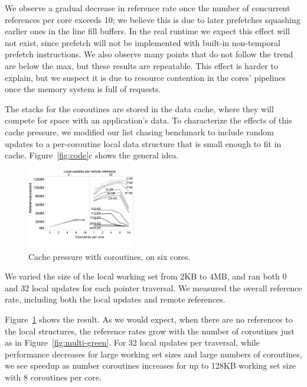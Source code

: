 \documentclass[10pt,nocopyrightspace,preprint]{sigplanconf}
\begin{document}
We observe a gradual decrease in reference rate once the number of
concurrent references per core exceeds 10; we believe this is due to
later prefetches squashing earlier ones in the line fill buffers. In the real runtime we expect this effect will not exist, since prefetch will not be implemented with built-in non-temporal prefetch instructions. We
also observe many points that do not follow the trend are below the max, but these results are repeatable. This effect is harder to explain, but we suspect it is
due to resource contention in the cores' pipelines once the memory
system is full of requests. 



The stacks for the coroutines are stored in the data cache, where they
will compete for space with an application's data. To characterize the
effects of this cache pressure, we modified our list chasing benchmark
to include random updates to a per-coroutine local data structure that
is small enough to fit in cache. Figure~\ref{fig:code}c shows the
general idea.

\begin{figure}[h]
  \begin{center}
    \includegraphics[width=0.42\textwidth]{figures/cache-pressure-edited.pdf}
  \end{center}
  \caption{Cache pressure with coroutines, on six cores.}
  \label{fig:cache-pressure}
\end{figure}

We varied the size of the local working set from 2KB
to 4MB, and ran both 0 and 32 local updates for each pointer
traversal. We measured the overall reference rate, including both the local updates and remote references.

Figure~\ref{fig:cache-pressure} shows the result. As we would expect,
when there are no references to the local structures, the reference rates grow with the number of coroutines just as in
Figure~\ref{fig:multi-green}. For 32 local updates per traversal, while performance
decreases for large working set sizes and large numbers of coroutines,
we see speedup as number coroutines increases for up to 128KB working set size with 8 coroutines per
core. 
\end{document}
